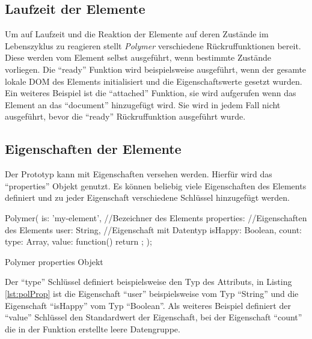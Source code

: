 \documentclass[12pt, paper=a4, bibtotoc, toc=listof, headsepline=true]{scrreprt}
\begin{document}
\subsection{Laufzeit der Elemente}
\label{sec:polLau}
Um auf Laufzeit und die Reaktion der Elemente auf deren Zustände im Lebenszyklus zu reagieren stellt \emph{Polymer} verschiedene Rückruffunktionen bereit. Diese werden vom Element selbst ausgeführt, wenn bestimmte Zustände vorliegen. Die \enquote{ready} Funktion wird beispielsweise ausgeführt, wenn der gesamte lokale \ac{DOM} des Elements initialisiert und die Eigenschaftswerte gesetzt wurden. Ein weiteres Beispiel ist die \enquote{attached} Funktion, sie wird aufgerufen wenn das Element an das \enquote{document} hinzugefügt wird. Sie wird in jedem Fall nicht ausgeführt, bevor die \enquote{ready} Rückruffunktion ausgeführt wurde\cite{polyReg}.
\subsection{Eigenschaften der Elemente}
Der Prototyp kann mit Eigenschaften versehen werden. Hierfür wird das \enquote{properties} Objekt genutzt. Es können beliebig viele Eigenschaften des Elements definiert und zu jeder Eigenschaft verschiedene Schlüssel hinzugefügt werden.
\begin{listing}
	\begin{JavaScriptcode*}{}
Polymer({
   is: 'my-element', //Bezeichner des Elements
   properties: {  //Eigenschaften des Elements
      user: String, //Eigenschaft mit Datentyp
      isHappy: Boolean,
      count: {
         type: Array,
         value: function() { return {}; }
      }
   }
});
	\end{JavaScriptcode*}
	\caption{Polymer properties Objekt}
	\label{lst:polProp}
\end{listing}
Der \enquote{type} Schlüssel definiert beispielsweise den Typ des Attributs, in Listing \ref{lst:polProp} ist die Eigenschaft \enquote{user} beispielsweise vom Typ \enquote{String} und die Eigenschaft \enquote{isHappy} vom Typ \enquote{Boolean}. Als weiteres Beispiel definiert der \enquote{value} Schlüssel den Standardwert der Eigenschaft, bei der Eigenschaft \enquote{count} die in der Funktion erstellte leere Datengruppe\cite{polyProp}.
\end{document}
